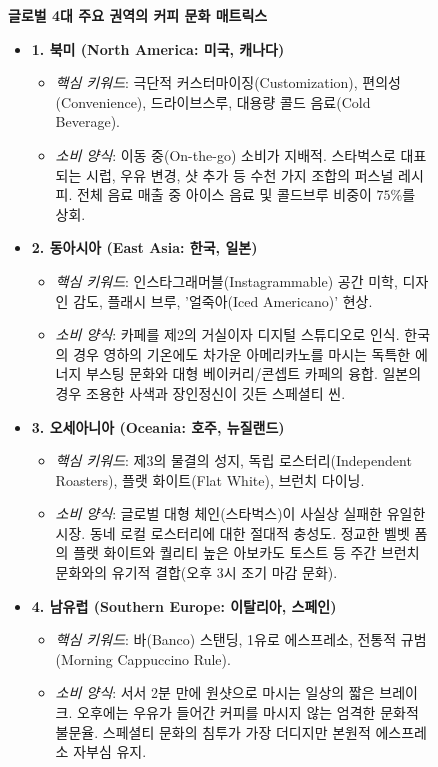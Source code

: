 \documentclass[10pt,a4paper]{article}
\begin{document}
\begin{figure}[h!]
\centering
\begin{tcolorbox}[width=0.96\textwidth,colback=white,colframe=CoffeeBrown]
\textbf{\large 글로벌 4대 주요 권역의 커피 문화 매트릭스}
\vspace{6pt}
\begin{itemize}[leftmargin=1.5em,itemsep=6pt]
    \item \textbf{1. 북미 (North America: 미국, 캐나다)}
    \begin{itemize}[itemsep=1pt]
        \item \textit{핵심 키워드}: 극단적 커스터마이징(Customization), 편의성(Convenience), 드라이브스루, 대용량 콜드 음료(Cold Beverage).
        \item \textit{소비 양식}: 이동 중(On-the-go) 소비가 지배적. 스타벅스로 대표되는 시럽, 우유 변경, 샷 추가 등 수천 가지 조합의 퍼스널 레시피. 전체 음료 매출 중 아이스 음료 및 콜드브루 비중이 $75\%$를 상회.
    \end{itemize}
    \item \textbf{2. 동아시아 (East Asia: 한국, 일본)}
    \begin{itemize}[itemsep=1pt]
        \item \textit{핵심 키워드}: 인스타그래머블(Instagrammable) 공간 미학, 디자인 감도, 플래시 브루, '얼죽아(Iced Americano)' 현상.
        \item \textit{소비 양식}: 카페를 제2의 거실이자 디지털 스튜디오로 인식. 한국의 경우 영하의 기온에도 차가운 아메리카노를 마시는 독특한 에너지 부스팅 문화와 대형 베이커리/콘셉트 카페의 융합. 일본의 경우 조용한 사색과 장인정신이 깃든 스페셜티 씬.
    \end{itemize}
    \item \textbf{3. 오세아니아 (Oceania: 호주, 뉴질랜드)}
    \begin{itemize}[itemsep=1pt]
        \item \textit{핵심 키워드}: 제3의 물결의 성지, 독립 로스터리(Independent Roasters), 플랫 화이트(Flat White), 브런치 다이닝.
        \item \textit{소비 양식}: 글로벌 대형 체인(스타벅스)이 사실상 실패한 유일한 시장. 동네 로컬 로스터리에 대한 절대적 충성도. 정교한 벨벳 폼의 플랫 화이트와 퀄리티 높은 아보카도 토스트 등 주간 브런치 문화와의 유기적 결합(오후 3시 조기 마감 문화).
    \end{itemize}
    \item \textbf{4. 남유럽 (Southern Europe: 이탈리아, 스페인)}
    \begin{itemize}[itemsep=1pt]
        \item \textit{핵심 키워드}: 바(Banco) 스탠딩, 1유로 에스프레소, 전통적 규범(Morning Cappuccino Rule).
        \item \textit{소비 양식}: 서서 2분 만에 원샷으로 마시는 일상의 짧은 브레이크. 오후에는 우유가 들어간 커피를 마시지 않는 엄격한 문화적 불문율. 스페셜티 문화의 침투가 가장 더디지만 본원적 에스프레소 자부심 유지.
    \end{itemize}
\end{itemize}
\end{tcolorbox}
\end{figure}
\end{document}
